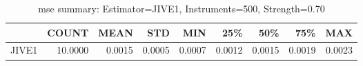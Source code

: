 \begin{table}[ht]
\centering
\caption{mse summary: Estimator=JIVE1, Instruments=500, Strength=0.70}
\begin{tabular}{lrrrrrrrr}
\toprule
 & COUNT & MEAN & STD & MIN & 25\% & 50\% & 75\% & MAX \\
\midrule
JIVE1 & 10.0000 & 0.0015 & 0.0005 & 0.0007 & 0.0012 & 0.0015 & 0.0019 & 0.0023 \\
\bottomrule
\end{tabular}
\end{table}
